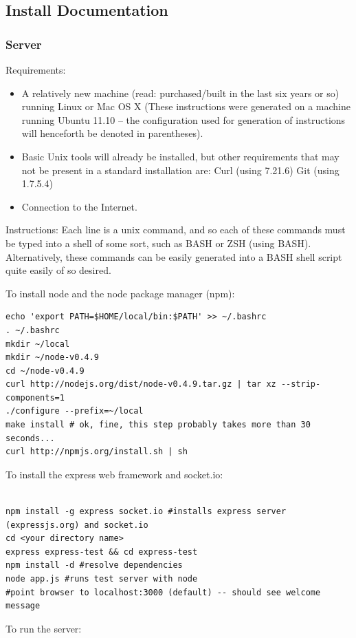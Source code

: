 \documentclass[letterpaper,12pt]{article}
\begin{document}
\subsection{Install Documentation}
\subsubsection{Server}
Requirements:
\begin{itemize}
\item A relatively new machine (read: purchased/built in the last six years or so) running Linux or Mac OS X (These instructions were generated on a machine running Ubuntu 11.10 -- the configuration used for generation of instructions will henceforth be denoted in parentheses).
\item Basic Unix tools will already be installed, but other requirements that may not be present in a standard installation are:
Curl (using 7.21.6)
Git (using 1.7.5.4)
\item Connection to the Internet. 
\end{itemize}
Instructions:
Each line is a unix command, and so each of these commands must be typed into a shell of some sort, such as BASH or ZSH (using BASH). Alternatively, these commands can be easily generated into a BASH shell script quite easily of so desired.

To install node and the node package manager (npm):

\begin{verbatim}
echo 'export PATH=$HOME/local/bin:$PATH' >> ~/.bashrc
. ~/.bashrc
mkdir ~/local
mkdir ~/node-v0.4.9
cd ~/node-v0.4.9
curl http://nodejs.org/dist/node-v0.4.9.tar.gz | tar xz --strip-components=1
./configure --prefix=~/local
make install # ok, fine, this step probably takes more than 30 seconds...
curl http://npmjs.org/install.sh | sh
\end{verbatim}

To install the express web framework and socket.io:

\begin{verbatim}

npm install -g express socket.io #installs express server (expressjs.org) and socket.io
cd <your directory name>
express express-test && cd express-test
npm install -d #resolve dependencies
node app.js #runs test server with node
#point browser to localhost:3000 (default) -- should see welcome message
\end{verbatim}

To run the server:
\end{document}

